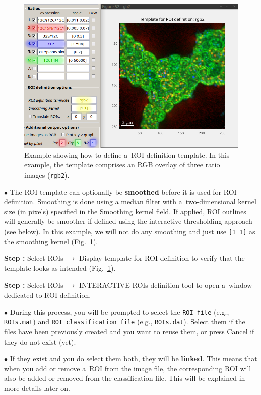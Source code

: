 \documentclass[a4paper, 11pt]{article}
\newcommand{\ttt}[1]{\texttt{#1}}
\newcommand{\lans}[1]{{\color{magenta}#1}}
\newcommand{\lanstf}[1]{{\color{cyan}#1}}
\newcommand\ra{\rightarrow}
\newcounter{step}
\newcommand\s{\addtocounter{step}{1}\vskip5pt\noindent\textbf{Step \thestep:}{ }}
\newcommand\bul{\vskip5pt\noindent$\bullet${ }}
\newcommand\bb[1]{\textbf{#1}}
\begin{document}
\begin{figure}[!ht]
\centering
\includegraphics[scale=0.4]{figs3/LANS-roi-template}
\caption{\label{fig:roi-template}%
Example showing how to define a~ROI definition template. In this example, the template comprises an RGB overlay of three ratio images (\ttt{rgb2}).}
\end{figure}

\bul The ROI template can optionally be \bb{smoothed} before it is used for ROI definition. Smoothing is done using a median filter with a~two-dimensional kernel size (in pixels) specified in the \lanstf{Smoothing kernel} field. If applied, ROI outlines will generally be smoother if defined using the \lans{interactive thresholding} approach (see below). In this example, we will not do any smoothing and just use \ttt{[1 1]} as the smoothing kernel (Fig.~\ref{fig:roi-template}).

\s Select \lans{ROIs} $\ra$ \lans{Display template for ROI definition} to verify that the template looks as intended (Fig.~\ref{fig:roi-template}). 

\s Select \lans{ROIs} $\ra$ \lans{INTERACTIVE ROIs definition tool} to open a~window dedicated to ROI definition. 

\bul During this process, you will be prompted to select the \ttt{ROI file} (e.g., \ttt{ROIs.mat}) and \ttt{ROI classification file} (e.g., \ttt{ROIs.dat}). Select them if the files have been previously created and you want to reuse them, or press \lans{Cancel} if they do not exist (yet).

\bul If they exist and you do select them both, they will be \bb{linked}. This means that when you add or remove a~ROI from the image file, the corresponding ROI will also be added or removed from the classification file. This will be explained in more details later on.
\end{document}

